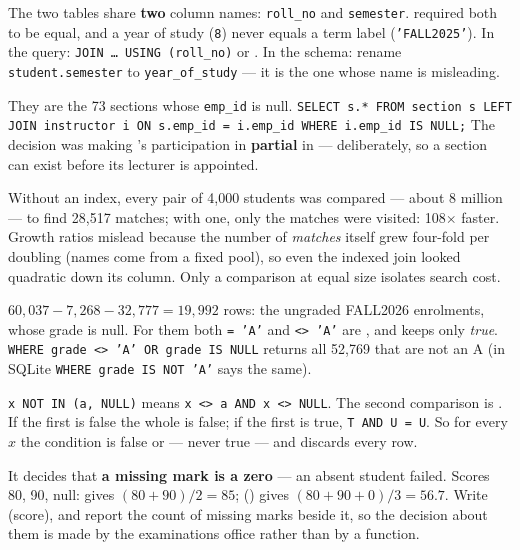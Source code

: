 \begin{ans}
  \item The two tables share \textbf{two} column names: \texttt{roll\_no} and
        \texttt{semester}.  required both to be equal, and
        a year of study (\texttt{8}) never equals a term label
        (\texttt{'FALL2025'}). In the query: \texttt{JOIN \dots\ USING
        (roll\_no)} or . In the schema: rename
        \texttt{student.semester} to \texttt{year\_of\_study} --- it is the one
        whose name is misleading.
  \item They are the 73 sections whose \texttt{emp\_id} is null.
        \texttt{SELECT s.* FROM section s LEFT JOIN instructor i ON
        s.emp\_id = i.emp\_id WHERE i.emp\_id IS NULL;} The decision was making
        's participation in  \textbf{partial} in
         --- deliberately, so a section can exist before its
        lecturer is appointed.
  \item Without an index, every pair of 4{,}000 students was compared ---
        about 8 million --- to find 28{,}517 matches; with one, only the
        matches were visited: 108$\times$ faster. Growth ratios mislead because
        the number of \emph{matches} itself grew four-fold per doubling (names
        come from a fixed pool), so even the indexed join looked quadratic down
        its column. Only a comparison at equal size isolates search cost.
\end{ans}

\begin{ans}
  \item $60{,}037 - 7{,}268 - 32{,}777 = 19{,}992$ rows: the ungraded FALL2026
        enrolments, whose grade is null. For them both \texttt{= 'A'} and
        \texttt{<> 'A'} are \unk{}, and  keeps only \emph{true}.
        \texttt{WHERE grade <> 'A' OR grade IS NULL} returns all 52{,}769 that
        are not an A (in SQLite \texttt{WHERE grade IS NOT 'A'} says the same).
  \item \texttt{x NOT IN (a, NULL)} means \texttt{x <> a AND x <> NULL}. The
        second comparison is \unk{}. If the first is false the whole is false;
        if the first is true, \texttt{T AND U = U}. So for every $x$ the
        condition is false or \unk{} --- never true --- and 
        discards every row.
  \item It decides that \textbf{a missing mark is a zero} --- an absent
        student failed. Scores 80, 90, null:  gives
        $(80+90)/2 = 85$; () gives $(80+90+0)/3 =
        56.7$. Write (score), and report the count of missing marks
        beside it, so the decision about them is made by the examinations
        office rather than by a function.
\end{ans}

